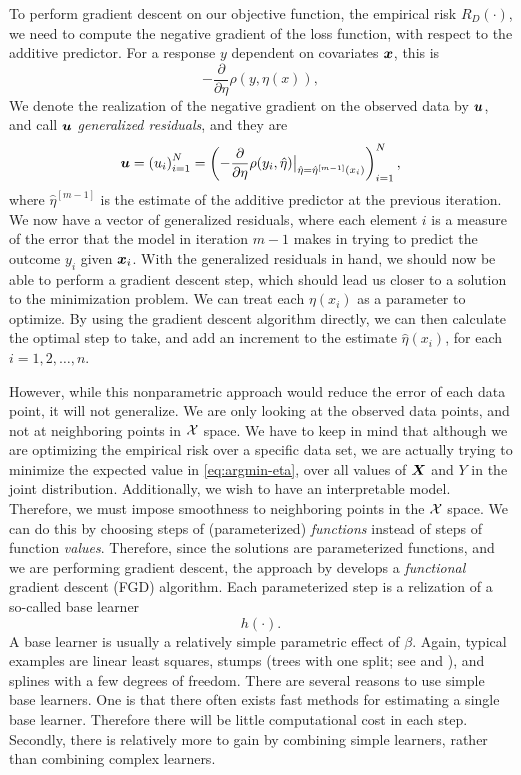 To perform gradient descent on our objective function, the empirical risk $R_D(\cdot)$,
we need to compute the negative gradient of the loss function, with respect to the additive predictor. For a response $y$ dependent on
covariates $\bm{x}$, this is
\begin{equation}
    -\frac{\partial}{\partial\eta} \rho(y,\eta(x)),
\end{equation}
We denote the realization of the negative gradient on the observed data by $\bm{u}$, and call $\bm{u}$ \textit{generalized residuals}, and they are
\begin{equation}
    \bm{u}=\left(u_i\right)_{i=1}^N=\left(-\frac{\partial}{\partial \eta}\rho(y_i, \hat{\eta})\big\rvert_{\hat{\eta}=\hat{\eta}^{[m-1]}(x_i)}\right)_{i=1}^N,
\end{equation}
where $\hat{\eta}^{[m-1]}$ is the estimate of the additive predictor at the previous iteration.
We now have a vector of generalized residuals, where each element $i$ is a measure of the error that the model in iteration $m-1$ makes
in trying to predict the outcome $y_i$ given $\bm{x}_i$.
With the generalized residuals in hand, we should now be able to perform a gradient descent step, which should lead us closer to a solution
to the minimization problem. We can treat each $\eta(x_i)$ as a parameter to optimize. By using the gradient descent algorithm directly, we
can then calculate the optimal step to take, and add an increment to the estimate $\hat{\eta}(x_i)$, for each $i=1,2,\ldots,n$.

However, while this nonparametric approach would reduce the error of each data point, it will not generalize.
We are only looking at the observed data points, and not at neighboring points in $\mathcal{X}$ space.
We have to keep in mind that although we are optimizing the empirical risk over a specific data set,
we are actually trying to minimize the expected value in \eqref{eq:argmin-eta}, over all values of $\bm{X}$ and $Y$ in the joint distribution.
Additionally, we wish to have an interpretable model.
Therefore, we must impose smoothness to neighboring points in the $\mathcal{X}$ space. We can do this by choosing steps of
(parameterized) \textit{functions} instead of steps of function \textit{values}.
Therefore, since the solutions are parameterized functions, and we are performing gradient descent,
the approach by \citet{friedman2001} develops a \textit{functional} gradient descent (FGD) algorithm.
Each parameterized step is a relization of a so-called base learner
\begin{equation}
    h(\cdot).
\end{equation}
A base learner is usually a relatively simple parametric effect of $\beta$. Again, typical examples are linear least squares, stumps (trees with one split; see \citet{buhlmann2007} and \citet{ESL}), and splines with a few degrees of freedom.
There are several reasons to use simple base learners. One is that there often exists fast methods for estimating a single base learner.
Therefore there will be little computational cost in each step. Secondly, there is relatively more to gain by combining simple learners,
rather than combining complex learners.

